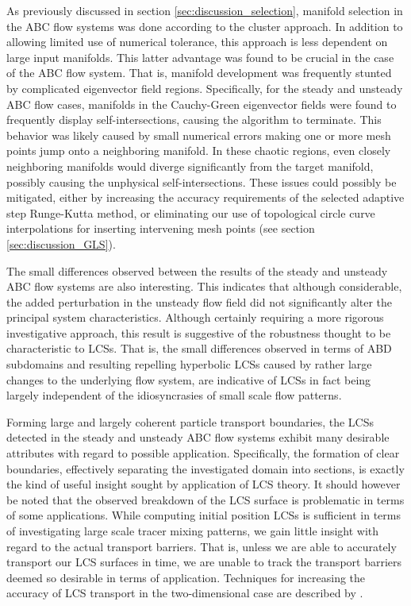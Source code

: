 As previously discussed in section \ref{sec:discussion_selection}, manifold selection in the ABC flow systems was done according to the cluster approach. In addition to allowing limited use of numerical tolerance, this approach is less dependent on large input manifolds. This latter advantage was found to be crucial in the case of the ABC flow system. That is, manifold development was frequently stunted by complicated eigenvector field regions. Specifically, for the steady and unsteady ABC flow cases, manifolds in the Cauchy-Green eigenvector fields were found to frequently display self-intersections, causing the algorithm to terminate. This behavior was likely caused by small numerical errors making one or more mesh points jump onto a neighboring manifold. In these chaotic regions, even closely neighboring manifolds would diverge significantly from the target manifold, possibly causing the unphysical self-intersections. These issues could possibly be mitigated, either by increasing the accuracy requirements of the selected adaptive step Runge-Kutta method, or eliminating our use of topological circle curve interpolations for inserting intervening mesh points (see section \ref{sec:discussion_GLS}).

The small differences observed between the results of the steady and unsteady ABC flow systems are also interesting. This indicates that although considerable, the added perturbation in the unsteady flow field did not significantly alter the principal system characteristics. Although certainly requiring a more rigorous investigative approach, this result is suggestive of the robustness thought to be characteristic to LCSs. That is, the small differences observed in terms of ABD subdomains and resulting repelling hyperbolic LCSs caused by rather large changes to the underlying flow system, are indicative of LCSs in fact being largely independent of the idiosyncrasies of small scale flow patterns.

Forming large and largely coherent particle transport boundaries, the LCSs detected in the steady and unsteady ABC flow systems exhibit many desirable attributes with regard to possible application. Specifically, the formation of clear boundaries, effectively separating the investigated domain into sections, is exactly the kind of useful insight sought by application of LCS theory. It should however be noted that the observed breakdown of the LCS surface is problematic in terms of some applications. While computing initial position LCSs is sufficient in terms of investigating large scale tracer mixing patterns, we gain little insight with regard to the actual transport barriers. That is, unless we are able to accurately transport our LCS surfaces in time, we are unable to track the transport barriers deemed so desirable in terms of application. Techniques for increasing the accuracy of LCS transport in the two-dimensional case are described by \cite{Haller12}. 

